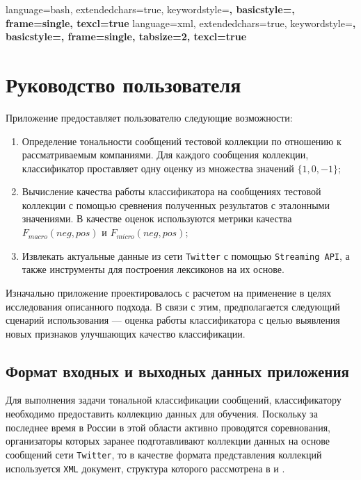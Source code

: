 {
    language=bash,
    extendedchars=true,
    keywordstyle=\bfseries,
    basicstyle=\footnotesize,
    frame=single,
    texcl=true
}
{
    language=xml,
    extendedchars=true,
    keywordstyle=\bfseries,
    basicstyle=\footnotesize,
    frame=single,
    tabsize=2,
    texcl=true
}


\section{Руководство пользователя}
Приложение предоставляет пользователю следующие возможности:
\begin{enumerate}
    \item Определение тональности сообщений тестовой коллекции по отношению к
    рассматриваемым компаниями. Для каждого сообщения коллекции, классификатор
    проставляет одну оценку из множества значений $\{1, 0, -1\}$;
    \item Вычисление качества работы классификатора на сообщениях тестовой
    коллекции с помощью сревнения полученных результатов с эталонными значениями.
    В качестве оценок используются метрики качества $F_{macro}(neg, pos)$ и
    $F_{micro}(neg, pos)$;
    \item Извлекать актуальные данные из сети {\tt Twitter} с помощью
    {\tt Streaming API}, а также инструменты для построения лексиконов на их
    основе.
\end{enumerate}

Изначально приложение проектировалось с расчетом на применение в целях
исследования описанного подхода. В связи с этим, предполагается следующий
сценарий использования --- оценка работы классификатора с целью выявления новых
признаков улучшающих качество классификации.
    \subsection{Формат входных и выходных данных приложения}
    Для выполнения задачи тональной классификации сообщений, классификатору
    необходимо предоставить коллекцию данных для обучения. Поскольку за последнее
    время в России в этой области активно проводятся соревнования, организаторы
    которых заранее подготавливают коллекции данных на основе сообщений сети
    {\tt Twitter}, то в качестве формата представления коллекций используется
    {\tt XML} документ, структура которого рассмотрена в \cite{dialog2015}
    и \cite{dialog2016}.

